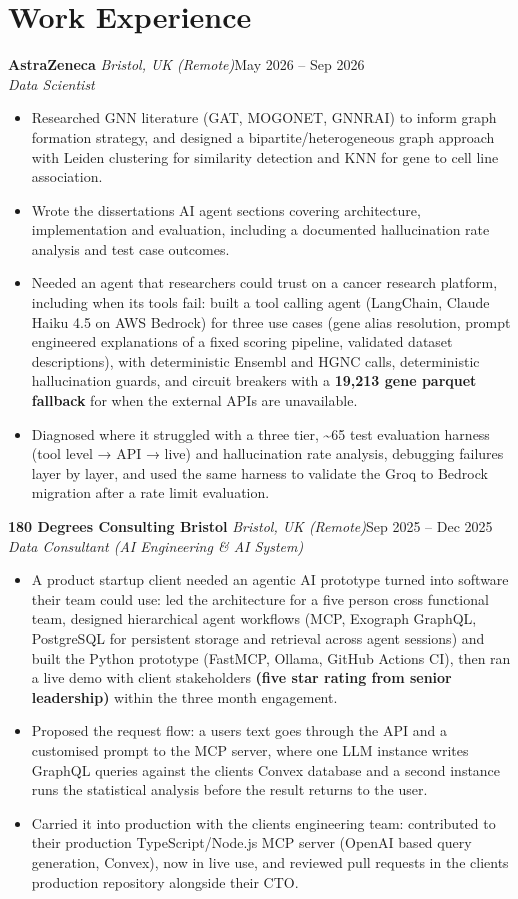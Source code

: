 \documentclass[a4paper,11pt]{article}
\newcommand{\role}[4]{%
  \textbf{#1}{\color{muted}\,\textperiodcentered\,\textit{#2}}\hfill{\color{muted}#3}\\
  \textit{#4}\par}
\newcommand{\gap}{\vspace{5pt}}
\newcommand{\num}[1]{\textbf{#1}}   %
\begin{document}
\section{Work Experience}
\role{AstraZeneca}{Bristol, UK (Remote)}{May 2026 – Sep 2026}{Data Scientist}
\begin{itemize}
  \item Researched GNN literature (GAT, MOGONET, GNNRAI) to inform graph formation strategy, and designed a bipartite/heterogeneous graph approach with Leiden clustering for similarity detection and KNN for gene to cell line association.
  \item Wrote the dissertation\textquotesingle{}s AI agent sections covering architecture, implementation and evaluation, including a documented hallucination rate analysis and test case outcomes.
  \item Needed an agent that researchers could trust on a cancer research platform, including when its tools fail: built a tool calling agent (LangChain, Claude Haiku 4.5 on AWS Bedrock) for three use cases (gene alias resolution, prompt engineered explanations of a fixed scoring pipeline, validated dataset descriptions), with deterministic Ensembl and HGNC calls, deterministic hallucination guards, and circuit breakers with a \num{19,213 gene parquet fallback} for when the external APIs are unavailable.
  \item Diagnosed where it struggled with a three tier, \textasciitilde{}65 test evaluation harness (tool level → API → live) and hallucination rate analysis, debugging failures layer by layer, and used the same harness to validate the Groq to Bedrock migration after a rate limit evaluation.
\end{itemize}
\gap
{}
\role{180 Degrees Consulting Bristol}{Bristol, UK (Remote)}{Sep 2025 – Dec 2025}{Data Consultant (AI Engineering \& AI System)}
\begin{itemize}
  \item A product startup client needed an agentic AI prototype turned into software their team could use: led the architecture for a five person cross functional team, designed hierarchical agent workflows (MCP, Exograph GraphQL, PostgreSQL for persistent storage and retrieval across agent sessions) and built the Python prototype (FastMCP, Ollama, GitHub Actions CI), then ran a live demo with client stakeholders \num{(five star rating from senior leadership)} within the three month engagement.
  \item Proposed the request flow: a user\textquotesingle{}s text goes through the API and a customised prompt to the MCP server, where one LLM instance writes GraphQL queries against the client\textquotesingle{}s Convex database and a second instance runs the statistical analysis before the result returns to the user.
  \item Carried it into production with the client\textquotesingle{}s engineering team: contributed to their production TypeScript/Node.js MCP server (OpenAI based query generation, Convex), now in live use, and reviewed pull requests in the client\textquotesingle{}s production repository alongside their CTO.
\end{itemize}
\end{document}
